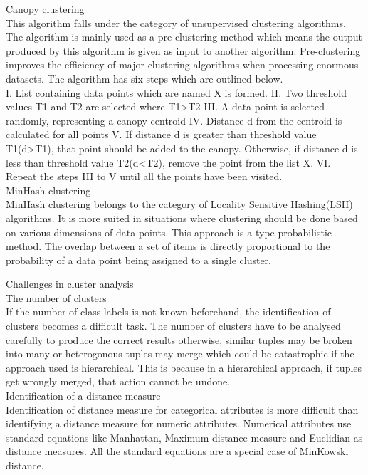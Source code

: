 \documentclass[conference]{IEEEtran}
\begin{document}
Canopy clustering \\
 
This algorithm falls under the category of unsupervised clustering algorithms. The algorithm is mainly used as a pre-clustering method which means the output produced by this algorithm is given as input to another algorithm. Pre-clustering improves the efficiency of major clustering algorithms when processing enormous datasets. The algorithm has six steps which are outlined below.\\

I. List containing data points which are named X is formed.
II. Two threshold values T1 and T2 are selected where T1>T2
III. A data point is selected randomly, representing a canopy centroid
IV. Distance d from the centroid is calculated for all points
V. If distance d is greater than threshold value T1(d>T1), that point should be added to the canopy. Otherwise, if distance d is less than threshold value T2(d<T2), remove the point from the list X.
VI. Repeat the steps III to V until all the points have been visited.\\

MinHash clustering\\

MinHash clustering belongs to the category of Locality Sensitive Hashing(LSH) algorithms. It is more suited in situations where clustering should be done based on various dimensions of data points. This approach is a type probabilistic method. The overlap between a set of items is directly proportional to the probability of a data point being assigned to a single cluster.

Challenges in cluster analysis\\

The number of clusters \\

If the number of class labels is not known beforehand, the identification of clusters becomes a difficult task. The number of clusters have to be analysed carefully to produce the correct results otherwise, similar tuples may be broken into many or heterogonous tuples may merge which could be catastrophic if the approach used is hierarchical. This is because in a hierarchical approach, if tuples get wrongly merged, that action cannot be undone.\\

Identification of a distance measure \\
Identification of distance measure for categorical attributes is more difficult than identifying a distance measure for numeric attributes. Numerical attributes use standard equations like Manhattan, Maximum distance measure and Euclidian as distance measures. All the standard equations are a special case of MinKowski distance. \\
\end{document}
